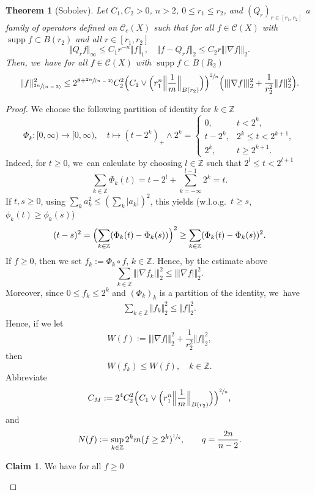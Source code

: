 \documentclass[10pt]{amsart}
\newcommand{\spfrac}[2]{\sfrac{#1}{(#2)}}
\theoremstyle{plain}
\newtheorem{theorem}{Theorem}[section]
\theoremstyle{definition}
\newtheorem*{claim}{Claim}
\newcommand{\ZZ}{\mathbb{Z}}
\newcommand{\cC}{\mathcal{C}}
\DeclareMathOperator{\supp}{supp}
\begin{document}
\begin{theorem}[Sobolev]\label{thm:SobM}
Let $C_1,C_2>0$, $n>2$, $0\leq r_1\leq r_2$,
and $(Q_r)_{r\in[r_1,r_2]}$ a family of operators defined on $\cC_c(X)$ such that for all $f\in\cC(X)$ with $\supp f\subset B(r_2)$ and all $r\in [r_1,r_2]$
\[
\Vert Q_rf\Vert_\infty\leq C_1 r^{-n}\Vert f\Vert_1, \quad \Vert f-Q_rf\Vert_2\leq C_2 r\Vert| \nabla f|\Vert_2.
\]
Then, we~have for all $f\in\cC(X)$ with $\supp f\subset B(R_2)$
\begin{align*}
\Vert f\Vert_{\spfrac{2n}{n-2}}^2
\leq 2^{8+\spfrac{2n}{n-2}}C_2^2
\Bigl(C_1\vee \Bigl(r_1^n\Bigl\Vert\frac1m\Bigr\Vert_{B(r_2)} \Bigr) \Bigr)^{\sfrac{2}{n}}
\Bigl(
\Vert |\nabla f|\Vert_2^2+\frac{1}{r_2^2}\Vert f\Vert_2^2 \Bigr).
\end{align*}
\end{theorem}
\begin{proof}
We choose the following partition of identity for $ k\in \mathbb{Z} $
\[
\Phi_k\colon [0,\infty)\to[0,\infty),\quad t\longmapsto (t-2^k)_+\wedge 2^k
=
\begin{cases}
0,& t<2^k,\\
t-2^k, &2^k\leq t<2^{k+1},\\
2^k,& t\geq 2^{k+1}.
\end{cases}
\]
Indeed, for $t\geq 0$, we~can calculate by choosing $l\in \ZZ$ such that $2^l\leq t<2^{l+1}$
\[
\sum_{k\in \mathbb{Z}}\Phi_k(t)=t-2^l+\sum_{k=-\infty}^{l-1}2^k=t.
\]
If $t,s\geq0$, using $\sum_k a_k^2\leq (\sum_k \vert a_k\vert)^2$, this yields (w.l.o.g.~$t\geq s$, \ie $ \phi_{k}(t)\ge \phi_{k}(s) $)
\[
(t-s)^2= \Bigl(\sum_{k\in \mathbb{Z}}(\Phi_k(t)-\Phi_k(s)) \Bigr)^2
\geq \sum_{k\in \mathbb{Z}}(\Phi_k(t)-\Phi_k(s))^2.
\]
If $f\ge 0$, then we set $f_k:=\Phi_k\circ f$, $k\in \ZZ$. Hence, by the estimate above
\[
\sum_{k\in \mathbb{Z}}\Vert \vert \nabla f_k\vert\Vert_2^2\leq \Vert \vert \nabla f\vert\Vert_2^2.
\]
Moreover,
since $0\leq f_k\leq 2^k$ and $(\Phi_k)_k$ is a partition of the identity, we~have
\begin{align*}
\sum_{k\in \mathbb{Z}} \Vert f_k\Vert_2^2
\leq \Vert f\Vert_2^2.
\end{align*}
Hence, if we let
\[
W(f):=\Vert| \nabla f|\Vert_2^2+\frac{1}{r_2^2}\Vert f\Vert_2^2,
\]
then
\[
W(f_k)
\leq W(f), \quad k\in\ZZ.
\]
Abbreviate
\[
C_M:=2^{4}C_2^2
\Bigl(C_1\vee \Bigl(r_1^n \Bigl\Vert\frac1m \Bigr\Vert_{B(r_2)} \Bigr) \Bigr)^{\sfrac{2}{n}},
\]
and
\[
N(f):=\sup_{k\in\ZZ} 2^k m(f\geq 2^k)^{\sfrac{1}{q}}, \qquad q=\frac{2n}{n-2}.
\]
\begin{claim}We have {for all $ f\ge 0 $}

\end{claim}
\end{proof}
\end{document}
